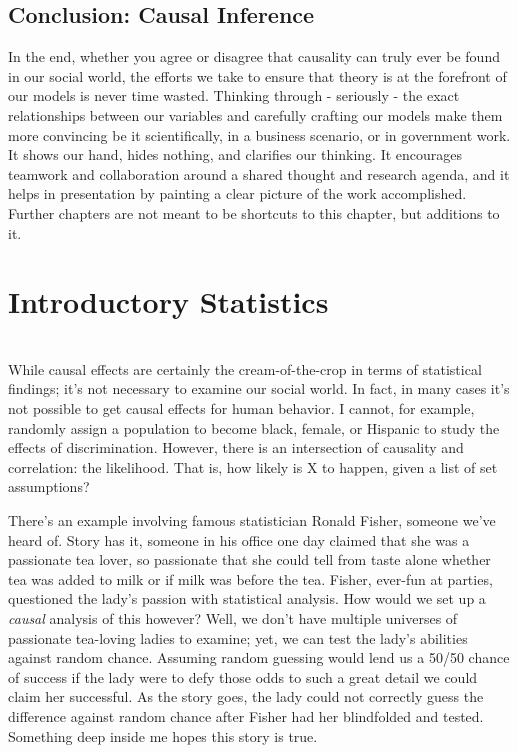 \documentclass[12pt]{article}\usepackage[]{graphicx}\usepackage[]{color}
\begin{document}
\begin{flushleft}
\subsection{Conclusion: Causal Inference}

In the end, whether you agree or disagree that causality can truly ever be found in our social world, the efforts we take to ensure that theory is at the forefront of our models is never time wasted. Thinking through - seriously - the exact relationships between our variables and carefully crafting our models make them more convincing be it scientifically, in a business scenario, or in government work. It shows our hand, hides nothing, and clarifies our thinking. It encourages teamwork and collaboration around a shared thought and research agenda, and it helps in presentation by painting a clear picture of the work accomplished. Further chapters are not meant to be shortcuts to this chapter, but additions to it.

\clearpage
\section{Introductory Statistics}
\hfill \\

While causal effects are certainly the cream-of-the-crop in terms of statistical findings; it's not necessary to examine our social world. In fact, in many cases it's not possible to get causal effects for human behavior. I cannot, for example, randomly assign a population to become black, female, or Hispanic to study the effects of discrimination. However, there is an intersection of causality and correlation: the likelihood. That is, how likely is X to happen, given a list of set assumptions?

There's an example involving famous statistician Ronald Fisher, someone we've heard of. Story has it, someone in his office one day claimed that she was a passionate tea lover, so passionate that she could tell from taste alone whether tea was added to milk or if milk was before the tea. Fisher, ever-fun at parties, questioned the lady's passion with statistical analysis. How would we set up a \textit{causal} analysis of this however? Well, we don't have multiple universes of passionate tea-loving ladies to examine; yet, we can test the lady's abilities against random chance. Assuming random guessing would lend us a 50/50 chance of success if the lady were to defy those odds to such a great detail we could claim her successful. As the story goes, the lady could not correctly guess the difference against random chance after Fisher had her blindfolded and tested. Something deep inside me hopes this story is true.


\end{flushleft}
\end{document}
